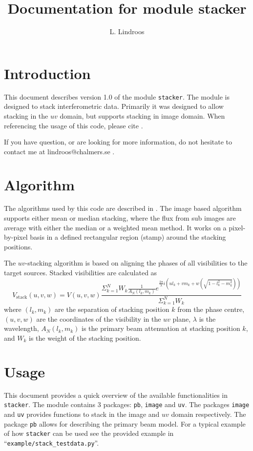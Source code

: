 \documentclass{article}
\title{Documentation for module stacker}
\author{L. Lindroos}
\begin{document}
\maketitle

\section{Introduction}
This document describes version 1.0 of the module {\tt stacker}.
The module is designed to stack interferometric data.
Primarily it was designed to allow stacking in the $uv$ domain, 
but supports stacking in image domain.
When referencing the usage of this code, please cite \cite{lindroos2014}.

If you have question, or are looking for more information, 
do not hesitate to contact me at lindroos@chalmers.se .

\section{Algorithm}
The algorithms used by this code are described in \cite{lindroos2014}.
The image based algorithm supports either mean or median stacking,
where the flux from sub images are average with either the median or a weighted mean method.
It works on a pixel-by-pixel basis in a defined rectangular region (stamp) around the stacking positions.

The $uv$-stacking algorithm is based on aligning the phases of all visibilities to the target sources.
Stacked visibilities are calculated as 
\begin{equation}
	V_\mathrm{stack}(u,v,w) = V(u,v,w) \frac{\Sigma_{k=1}^N W_k \frac{1}{A_N(l_k, m_k)} e^{\frac{2\pi}{\lambda} i \left( u l_k + v m_k + w(\sqrt{1-l_k^2-m_k^2})\right)} 
	}{\Sigma_{k=1}^N W_k}
	\label{eq:uvstack}
\end{equation}
where $(l_k, m_k)$ are the separation of stacking position $k$ from the phase centre,
$(u,v,w)$ are the coordinates of the visibility in the $uv$ plane,
$\lambda$ is the wavelength, 
$A_N(l_k, m_k)$ is the primary beam attenuation at stacking position $k$,
and $W_k$ is the weight of the stacking position.

\section{Usage}
This document provides a quick overview of the available functionalities in {\tt stacker}.
The module contains 3 packages: {\tt pb}, {\tt image} and {\tt uv}.
The packages {\tt image} and {\tt uv} provides functions to stack in the image and $uv$ domain respectively.
The package {\tt pb} allows for describing the primary beam model.
For a typical example of how {\tt stacker} can be used see the provided example in ``{\tt example/stack\_testdata.py}''.
\end{document}
